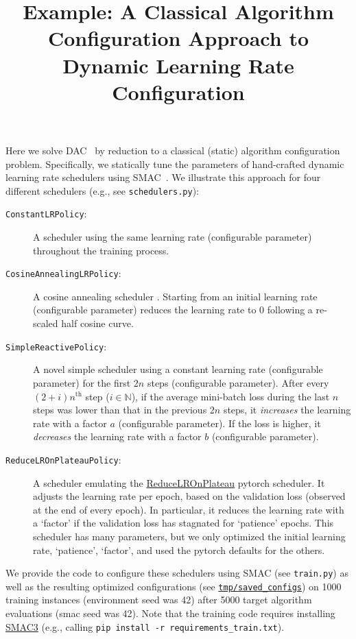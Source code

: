 \documentclass[11pt, final]{article}
\title{Example: A Classical Algorithm Configuration Approach to Dynamic Learning Rate Configuration}
\author[1]{\nameemail{Steven Adriaensen}{adriaens@cs.uni-freiburg.de}}
\author[1]{\nameemail{G\"{o}ktu\u{g} Karaka\c{s}l{\i}}{karakasg@cs.uni-freiburg.de}}
\affil[1]{University of Freiburg}
\begin{document}
\maketitle

\noindent Here we solve DAC~\cite{biedenkapp-ecai20} by reduction to a classical (static) algorithm configuration problem. Specifically, we statically tune the parameters of hand-crafted dynamic learning rate schedulers using SMAC~\cite{hutter-lion11a}. We illustrate this approach for four different schedulers (e.g., see \texttt{schedulers.py}):
\begin{description}
\item[\texttt{ConstantLRPolicy}:] A scheduler using the same learning rate (configurable parameter) throughout the training process.
\item[\texttt{CosineAnnealingLRPolicy}:] A cosine annealing scheduler \cite{loshchilov-iclr17a}. Starting from an initial learning rate (configurable parameter) reduces the learning rate to 0 following a re-scaled half cosine curve.
\item[\texttt{SimpleReactivePolicy}:] A novel simple scheduler using a constant learning rate (configurable parameter) for the first 2$n$ steps (configurable parameter). After every $(2+i) n^{\textrm{th}}$ step ($i \in \mathbb{N}$), if the average mini-batch loss during the last $n$ steps was lower than that in the previous 2$n$ steps, it \emph{increases} the learning rate with a factor $a$ (configurable parameter). If the loss is higher, it \emph{decreases} the learning rate with a factor ${b}$ (configurable parameter). 
\item[\texttt{ReduceLROnPlateauPolicy}:] A scheduler emulating the \href{https://pytorch.org/docs/stable/generated/torch.optim.lr_scheduler.ReduceLROnPlateau.html}{ReduceLROnPlateau} pytorch scheduler. It adjusts the learning rate per epoch, based on the validation loss (observed at the end of every epoch). In particular, it reduces the learning rate with a `factor' if the validation loss has stagnated for `patience' epochs.
This scheduler has many parameters, but we only optimized the initial learning rate, `patience', `factor', and used the pytorch defaults for the others.
\end{description}
We provide the code to configure these schedulers using SMAC (see \texttt{train.py}) as well as the resulting optimized configurations (see \texttt{\url{tmp/saved_configs}}) on 1000 training instances (environment seed was 42) after 5000 target algorithm evaluations (smac seed was 42). Note that the training code requires installing \href{https://github.com/automl/SMAC3}{SMAC3} (e.g., calling \texttt{pip install -r requirements\_train.txt}).
\end{document}
